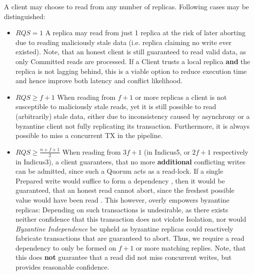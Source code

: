 A client may choose to read from any number of replicas. Following cases may be distinguished:
\begin{itemize}
\item \textbf{$RQS = 1$} A replica may read from just 1 replica at the risk of later aborting due to reading maliciously stale data (i.e. replica claiming no write ever existed). Note, that an honest client is still guaranteed to read valid data, as only Committed reads are processed. If a Client trusts a local replica \textbf{and} the replica is not lagging behind, this is a viable option to reduce execution time and hence improve both latency and conflict likelihood.
\item \textbf{$RQS \geq f+1$} When reading from $f+1$ or more replicas a client is not susceptible to maliciously stale reads, yet it is still possible to read (arbitrarily) stale data, either due to inconsistency caused by asynchrony or a byzantine client not fully replicating its transaction. Furthermore, it is always possible to miss a concurrent TX in the pipeline.
\item \textbf{$RQS \geq \frac{n+f+1}{2}$} When reading from $3f+1$ (in Indicus5, or $2f+1$ respectively in Indicus3), a client guarantees, that no more \textbf{additional} conflicting writes can be admitted, since such a Quorum acts as a read-lock. If a single Prepared write would suffice to form a dependency , then it would be guaranteed, that an honest read cannot abort, since the freshest possible value would have been read . This however, overly empowers byzantine replicas:  Depending on such transactions is undesirable, as there exists neither confidence that this transaction does not violate Isolation, nor would \textit{Byzantine Independence} be upheld as byzantine replicas could reactively fabricate transactions that are guaranteed to abort. Thus, we require a read dependency to only be formed on $f+1$ or more matching replies. Note, that this does \textbf{not} guarantee that a read did not miss concurrent writes, but provides reasonable confidence.

\end{itemize}


